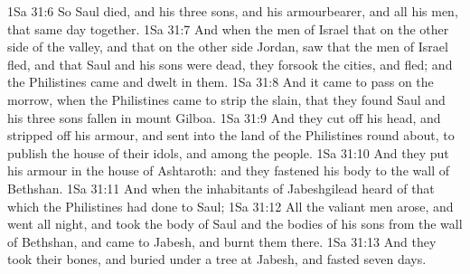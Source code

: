 \vs 1Sa 31:6 So Saul died, and his three sons, and his armourbearer, and all his men, that same day together.
\vs 1Sa 31:7 And when the men of Israel that  on the other side of the valley, and  that  on the other side Jordan, saw that the men of Israel fled, and that Saul and his sons were dead, they forsook the cities, and fled; and the Philistines came and dwelt in them.
\vs 1Sa 31:8 And it came to pass on the morrow, when the Philistines came to strip the slain, that they found Saul and his three sons fallen in mount Gilboa.
\vs 1Sa 31:9 And they cut off his head, and stripped off his armour, and sent into the land of the Philistines round about, to publish  the house of their idols, and among the people.
\vs 1Sa 31:10 And they put his armour in the house of Ashtaroth: and they fastened his body to the wall of Bethshan.
\vs 1Sa 31:11 And when the inhabitants of Jabeshgilead heard of that which the Philistines had done to Saul;
\vs 1Sa 31:12 All the valiant men arose, and went all night, and took the body of Saul and the bodies of his sons from the wall of Bethshan, and came to Jabesh, and burnt them there.
\vs 1Sa 31:13 And they took their bones, and buried  under a tree at Jabesh, and fasted seven days.
